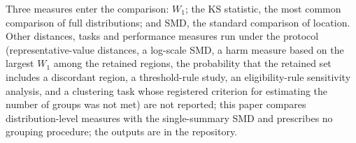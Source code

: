 \documentclass[AMA,Times1COL]{WileyNJDv5}
\begin{document}
Three measures enter the comparison: $W_1$; the KS statistic, the most common comparison of full distributions; and SMD, the standard comparison of location. %
Other distances, tasks and performance measures run under the protocol (representative-value distances, a log-scale SMD, a harm measure based on the largest $W_1$ among the retained regions, the probability that the retained set includes a discordant region, a threshold-rule study, an eligibility-rule sensitivity analysis, and a clustering task whose registered criterion for estimating the number of groups was not met) are not reported; this paper compares distribution-level measures with the single-summary SMD and prescribes no grouping procedure; the outputs are in the repository.
\end{document}
